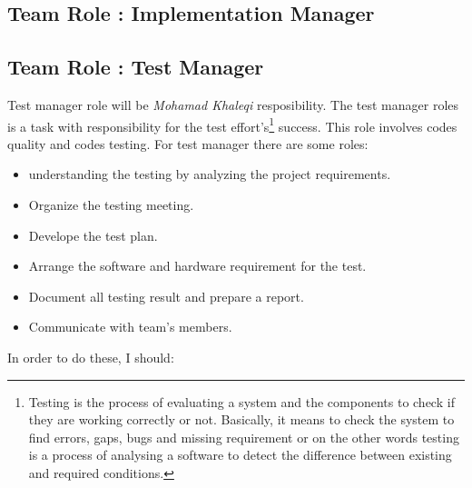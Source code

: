 \documentclass{article}
\begin{document}
\subsection{Team Role : Implementation Manager}

\newpage
\subsection{Team Role : Test Manager}
Test manager role will be \textit{Mohamad Khaleqi} resposibility. The test manager roles is a task with responsibility for the test effort's\footnote{Testing is the process of evaluating a system and the components to check if they are working correctly or not. Basically, it means to check the system to find errors, gaps, bugs and missing requirement or on the other words testing is a process of analysing a software to detect the difference between existing and required conditions.
} success. This role involves codes quality and codes testing. For test manager there are some roles:
\begin{itemize}
 \item understanding the testing by analyzing the project requirements.
 \item Organize the testing meeting.
 \item Develope the test plan.
 \item Arrange the software and hardware requirement for the test.
 \item Document all testing result and prepare a report.
 \item Communicate with team's members.
\end{itemize}
In order to do these, I should:
\end{document}
